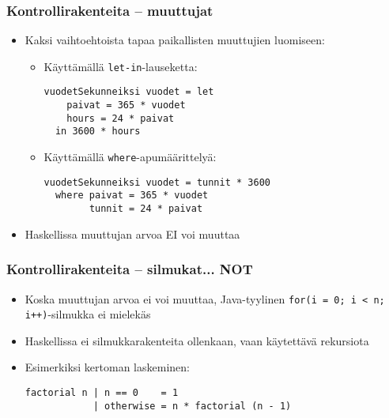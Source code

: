 \documentclass{beamer}
\begin{document}
\begin{frame}[fragile]
\frametitle{Kontrollirakenteita -- muuttujat}
\begin{itemize}
\item{Kaksi vaihtoehtoista tapaa paikallisten muuttujien luomiseen:}
\begin{itemize}

\item{Käyttämällä \texttt{let-in}-lauseketta:}
\begin{verbatim}
vuodetSekunneiksi vuodet = let
    paivat = 365 * vuodet
    hours = 24 * paivat
  in 3600 * hours
\end{verbatim}

\item{Käyttämällä \texttt{where}-apumäärittelyä:}
\begin{verbatim}
vuodetSekunneiksi vuodet = tunnit * 3600
  where paivat = 365 * vuodet
        tunnit = 24 * paivat
\end{verbatim}

\end{itemize}
\item{Haskellissa muuttujan arvoa EI voi muuttaa}
\end{itemize}
\end{frame}

\begin{frame}[fragile]
\frametitle{Kontrollirakenteita -- silmukat... NOT}
\begin{itemize}
\item{Koska muuttujan arvoa ei voi muuttaa, Java-tyylinen \mbox{\texttt{for(i = 0; i < n; i++)}}-silmukka ei mielekäs}
\item{Haskellissa ei silmukkarakenteita ollenkaan, vaan käytettävä rekursiota}
\item{Esimerkiksi kertoman laskeminen:}
\begin{verbatim}
factorial n | n == 0    = 1
            | otherwise = n * factorial (n - 1)
\end{verbatim}
\end{itemize}
\end{frame}
\end{document}
